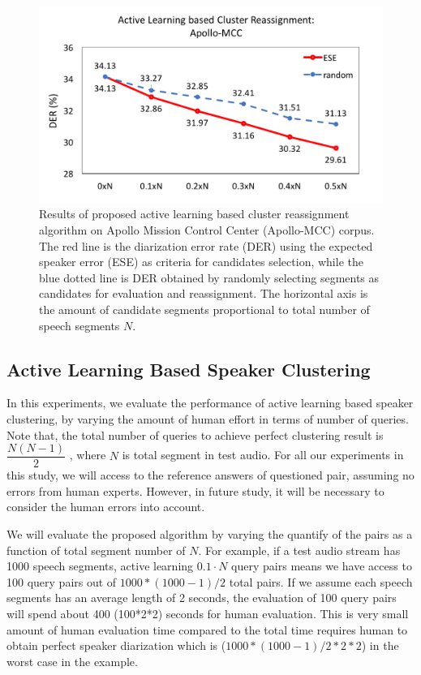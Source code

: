 \documentclass[journal]{IEEEtran}
\begin{document}
\begin{figure}
	\includegraphics[width=\linewidth]{figs/exp2_1}
	\caption{Results of proposed active learning based cluster reassignment algorithm on Apollo Mission Control Center (Apollo-MCC) corpus. The red line is the diarization error rate (DER) using the expected speaker error (ESE) as criteria for candidates selection, while the blue dotted line is DER obtained by randomly selecting segments as candidates for evaluation and reassignment. The horizontal axis is the amount of candidate segments proportional to total number of speech segments $N$.}
	\label{exp2_2}
\end{figure}

\subsection{Active Learning Based Speaker Clustering}
In this experiments, we evaluate the performance of active learning based speaker clustering, by varying the amount of human effort in terms of number of queries. Note that, the total number of queries to achieve perfect clustering result is $\dfrac{N(N-1)}{2}$ , where $N$ is total segment in test audio.
For all our experiments in this study, we will access to the reference answers of questioned pair, assuming no errors from human experts. However, in future study, it will be necessary to consider the human errors into account.

We will evaluate the proposed algorithm by varying the quantify of the pairs as a function of total segment number of $N$. For example, if a test audio stream has 1000 speech segments, active learning $0.1\cdot N$ query pairs means we have access to 100 query pairs out of $1000*(1000-1)/2$ total pairs. If we assume each speech segments has an average length of 2 seconds, the evaluation of 100 query pairs will spend about 400 (100*2*2) seconds for human evaluation. This is very small amount of human evaluation time compared to the total time requires human to obtain perfect speaker diarization which is ($1000*(1000-1)/2*2*2$) in the worst case in the example.
\end{document}
